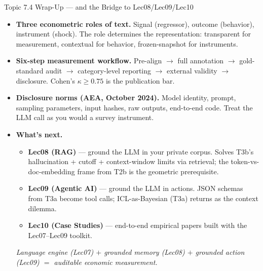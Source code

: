 \begin{frame}{Topic 7.4 Wrap-Up --- and the Bridge to Lec08/Lec09/Lec10}
\begin{itemize}
\item \textbf{Three econometric roles of text.} Signal (regressor), outcome (behavior), instrument (shock). The role determines the representation: transparent for measurement, contextual for behavior, frozen-snapshot for instruments.

\medskip
\item \textbf{Six-step measurement workflow.} Pre-align $\to$ full annotation $\to$ gold-standard audit $\to$ category-level reporting $\to$ external validity $\to$ disclosure. Cohen's $\kappa \ge 0.75$ is the publication bar.

\medskip
\item \textbf{Disclosure norms (AEA, October 2024).} Model identity, prompt, sampling parameters, input hashes, raw outputs, end-to-end code. Treat the LLM call as you would a survey instrument.

\medskip
\item \textbf{What's next.}
\begin{itemize}
    \item \textbf{Lec08 (RAG)} --- ground the LLM in your private corpus. Solves T3b's hallucination + cutoff + context-window limits via retrieval; the token-vs-doc-embedding frame from T2b is the geometric prerequisite.
    \item \textbf{Lec09 (Agentic AI)} --- ground the LLM in actions. JSON schemas from T3a become tool calls; ICL-as-Bayesian (T3a) returns as the context dilemma.
    \item \textbf{Lec10 (Case Studies)} --- end-to-end empirical papers built with the Lec07--Lec09 toolkit.
\end{itemize}

\medskip
\centering\emph{Language engine (Lec07) $+$ grounded memory (Lec08) $+$ grounded action (Lec09) $=$ auditable economic measurement.}
\end{itemize}
\end{frame}


